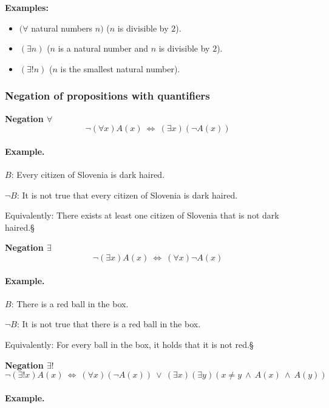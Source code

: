 \documentclass[11pt,paper=b5,footinclude,headinclude]{scrbook} %
\def\ali {{~\vee~}}
\def\inn {{~\wedge~}}
\def\cee {{~\Leftrightarrow~}}
\def\kz{{\hfill{\S}}}%
\theoremstyle{remark}
\theoremstyle{definition} %
\theoremstyle{theorem} %
\begin{document}
\medskip
\textbf{ Examples:}
\begin{itemize}
  \item
$(\forall$ natural numbers $n)$ ($n$ is divisible by $2$).
  \item
$(\exists n)$ ($n$ is a natural number and $n$ is divisible by $2$).
  \item
$(\exists !n)$ ($n$ is the smallest natural number).
\end{itemize}

\subsubsection{Negation of propositions with quantifiers}

\textbf{ Negation $\forall$}
$$\neg (\forall x)A(x) \cee  (\exists x) (\neg A(x))$$

\medskip
\paragraph{Example.}

$B$: Every citizen of Slovenia is dark haired.

$\neg B$: It is not true that every citizen of Slovenia is dark haired.

Equivalently: There exists at least one citizen of Slovenia that is not dark haired.\kz

\medskip

\noindent\textbf{ Negation $\exists$}
$$\neg  (\exists x)A(x) \cee (\forall x) \neg A(x)$$

\medskip
\paragraph{Example.}

$B$: There is a red ball in the box.

$\neg B$: It is not true that there is a red ball in the box.

Equivalently: For every ball in the box, it holds that it is not red.\kz


\medskip

\noindent\textbf{ Negation $\exists !$}
$$\neg (\exists ! x)A(x) \cee  (\forall x) (\neg A(x)) \ali (\exists x)(\exists y)(x\neq y\inn A(x) \inn A(y))$$

\medskip
\paragraph{Example.}
\end{document}
